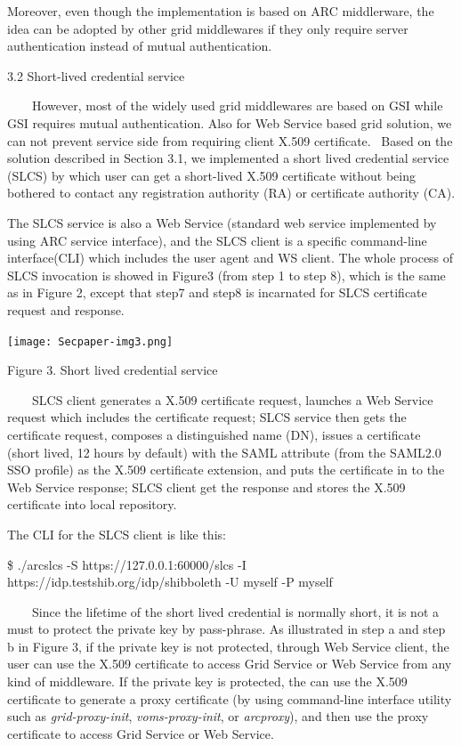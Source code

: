 \documentclass{article}
\begin{document}
Moreover, even though the implementation is based on ARC middlerware,
the idea can be adopted by other grid middlewares if they only require
server authentication instead of mutual authentication.

3.2 Short-lived credential service

\ \ \ \ However, most of the widely used grid middlewares are based on
GSI while GSI requires mutual authentication. Also for Web Service
based grid solution, we can not prevent service side from requiring
client X.509 certificate. \ Based on the solution described in Section
3.1, we implemented a short lived credential service (SLCS) by which
user can get a short-lived X.509 certificate without being bothered to
contact any registration authority (RA) or certificate authority (CA).

The SLCS service is also a Web Service (standard web service implemented
by using ARC service interface), and the SLCS client is a specific
command-line interface(CLI) which includes the user agent and WS
client. The whole process of SLCS invocation is showed in Figure3 (from
step 1 to step 8), which is the same as in Figure 2, except that step7
and step8 is incarnated for SLCS certificate request and response. 


\bigskip



\begin{center}
\texttt{[image: Secpaper-img3.png]}
\end{center}
{\centering
Figure 3. Short lived credential service
\par}

\ \ \ \ SLCS client generates a X.509 certificate request, launches a
Web Service request which includes the certificate request; SLCS
service then gets the certificate request, composes a distinguished
name (DN), issues a certificate (short lived, 12 hours by default) with
the SAML attribute (from the SAML2.0 SSO profile) as the X.509
certificate extension, and puts the certificate in to the Web Service
response; SLCS client get the response and stores the X.509 certificate
into local repository.

The CLI for the SLCS client is like this:

\$ ./arcslcs -S https://127.0.0.1:60000/slcs -I
https://idp.testshib.org/idp/shibboleth -U myself -P myself

\ \ \ \ Since the lifetime of the short lived credential is normally
short, it is not a must to protect the private key by pass-phrase. As
illustrated in step a and step b in Figure 3, if the private key is not
protected, through Web Service client, the user can use the X.509
certificate to access Grid Service or Web Service from any kind of
middleware. If the private key is protected, the can use the X.509
certificate to generate a proxy certificate (by using command-line
interface utility such as \textit{grid-proxy-init},
\textit{voms-proxy-init}, or \textit{arcproxy}), and then use the proxy
certificate to access Grid Service or Web Service. 
\end{document}
